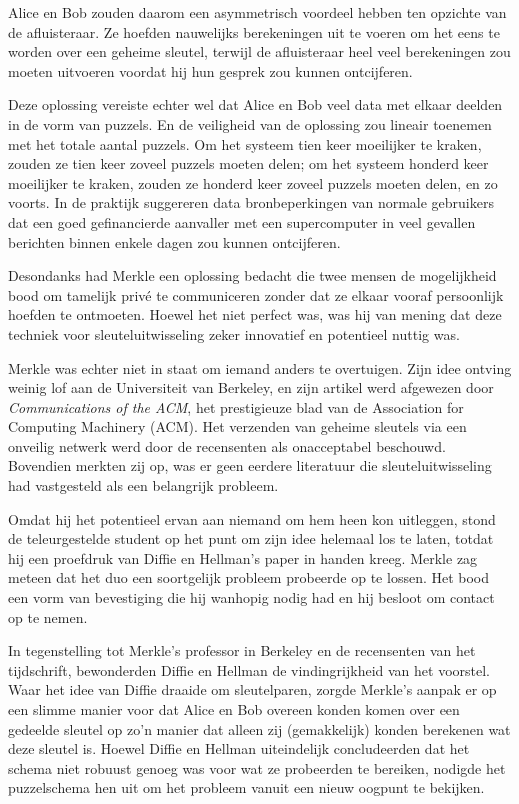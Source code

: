 \documentclass[
  a5paper,
  smalldemyvopaper,11pt,twoside,onecolumn,openright,extrafontsizes]{memoir}
\begin{document}
Alice en Bob zouden daarom een asymmetrisch voordeel hebben ten opzichte
van de afluisteraar. Ze hoefden nauwelijks berekeningen uit te voeren om
het eens te worden over een geheime sleutel, terwijl de afluisteraar
heel veel berekeningen zou moeten uitvoeren voordat hij hun gesprek zou
kunnen ontcijferen.

Deze oplossing vereiste echter wel dat Alice en Bob veel data met elkaar
deelden in de vorm van puzzels. En de veiligheid van de oplossing zou
lineair toenemen met het totale aantal puzzels. Om het systeem tien keer
moeilijker te kraken, zouden ze tien keer zoveel puzzels moeten delen;
om het systeem honderd keer moeilijker te kraken, zouden ze honderd keer
zoveel puzzels moeten delen, en zo voorts. In de praktijk suggereren
data bronbeperkingen van normale gebruikers dat een goed gefinancierde
aanvaller met een supercomputer in veel gevallen berichten binnen enkele
dagen zou kunnen ontcijferen.

Desondanks had Merkle een oplossing bedacht die twee mensen de
mogelijkheid bood om tamelijk privé te communiceren zonder dat ze elkaar
vooraf persoonlijk hoefden te ontmoeten. Hoewel het niet perfect was,
was hij van mening dat deze techniek voor sleuteluitwisseling zeker
innovatief en potentieel nuttig was.

Merkle was echter niet in staat om iemand anders te overtuigen. Zijn
idee ontving weinig lof aan de Universiteit van Berkeley, en zijn
artikel werd afgewezen door \emph{Communications of the ACM}, het
prestigieuze blad van de Association for Computing Machinery (ACM). Het
verzenden van geheime sleutels via een onveilig netwerk werd door de
recensenten als onacceptabel beschouwd. Bovendien merkten zij op, was er
geen eerdere literatuur die sleuteluitwisseling had vastgesteld als een
belangrijk probleem.

Omdat hij het potentieel ervan aan niemand om hem heen kon uitleggen,
stond de teleurgestelde student op het punt om zijn idee helemaal los te
laten, totdat hij een proefdruk van Diffie en Hellman's paper in handen
kreeg. Merkle zag meteen dat het duo een soortgelijk probleem probeerde
op te lossen. Het bood een vorm van bevestiging die hij wanhopig nodig
had en hij besloot om contact op te nemen.

In tegenstelling tot Merkle's professor in Berkeley en de recensenten
van het tijdschrift, bewonderden Diffie en Hellman de vindingrijkheid
van het voorstel. Waar het idee van Diffie draaide om sleutelparen,
zorgde Merkle's aanpak er op een slimme manier voor dat Alice en Bob
overeen konden komen over een gedeelde sleutel op zo'n manier dat alleen
zij (gemakkelijk) konden berekenen wat deze sleutel is. Hoewel Diffie en
Hellman uiteindelijk concludeerden dat het schema niet robuust genoeg
was voor wat ze probeerden te bereiken, nodigde het puzzelschema hen uit
om het probleem vanuit een nieuw oogpunt te bekijken.
\end{document}
